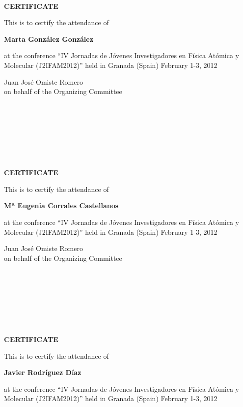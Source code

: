 \documentclass [13pt,a4paper] {letter}
\begin{document}
\begin{verbatim}







\end{verbatim}
\pagestyle{empty}
\begin{center}
{\bf {\Huge CERTIFICATE}}

\vspace {1.5cm}
This is to certify the attendance of
\vspace {1cm}

{\bf \Large  Marta  González  González }
\vspace {1cm}

at the conference { \textquotedblleft IV Jornadas de Jóvenes Investigadores en Física Atómica y Molecular (J2IFAM2012)\textquotedblright} 
held in Granada (Spain) February 1-3, 2012
\end{center}
\vspace {4cm}
\begin{raggedleft}
Juan José Omiste Romero\\
on behalf of the Organizing Committee
\newpage
\end{raggedleft}
\begin{verbatim}







\end{verbatim}
\pagestyle{empty}
\begin{center}
{\bf {\Huge CERTIFICATE}}

\vspace {1.5cm}
This is to certify the attendance of
\vspace {1cm}

{\bf \Large  Mª Eugenia  Corrales  Castellanos }
\vspace {1cm}

at the conference { \textquotedblleft IV Jornadas de Jóvenes Investigadores en Física Atómica y Molecular (J2IFAM2012)\textquotedblright} 
held in Granada (Spain) February 1-3, 2012
\end{center}
\vspace {4cm}
\begin{raggedleft}
Juan José Omiste Romero\\
on behalf of the Organizing Committee
\newpage
\end{raggedleft}
\begin{verbatim}







\end{verbatim}
\pagestyle{empty}
\begin{center}
{\bf {\Huge CERTIFICATE}}

\vspace {1.5cm}
This is to certify the attendance of
\vspace {1cm}

{\bf \Large  Javier    Rodríguez Díaz }
\vspace {1cm}

at the conference { \textquotedblleft IV Jornadas de Jóvenes Investigadores en Física Atómica y Molecular (J2IFAM2012)\textquotedblright} 
held in Granada (Spain) February 1-3, 2012
\end{center}
\end{document}
